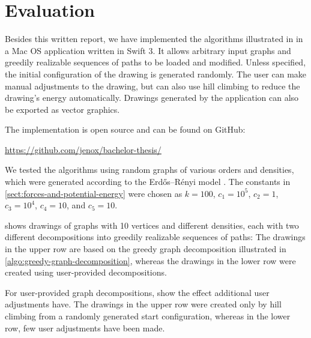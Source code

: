 \section{Evaluation}
\label{sect:evaluation}

\newcommand{\expnumber}[2]{{#1}\mathrm{e}{#2}}
\newcommand{\drawing}[1]{\setlength\fboxsep{0pt}\colorbox{gray!10}{\makebox(110,110){\texttt{[image: \#1]}}}}

Besides this written report, we have implemented the algorithms illustrated in  in a Mac OS application written in Swift 3. It allows arbitrary input graphs and greedily realizable sequences of paths to be loaded and modified. Unless specified, the initial configuration of the drawing is generated randomly. The user can make manual adjustments to the drawing, but can also use hill climbing to reduce the drawing's energy automatically. Drawings generated by the application can also be exported as vector graphics.

The implementation is open source and can be found on GitHub:
%
\begin{center}
  \url{https://github.com/jenox/bachelor-thesis/}
\end{center}






We tested the algorithms using random graphs of various orders and densities, which were generated according to the Erdős--Rényi model \cite{Erdos, Gilbert}. The constants in \cref{sect:forces-and-potential-energy} were chosen as ${k = 100}$, ${c_1 = 10^5}$, ${c_2 = 1}$, ${c_3 = 10^4}$, ${c_4 = 10}$, and ${c_5 = 10}$.

 shows drawings of graphs with 10 vertices and different densities, each with two different decompositions into greedily realizable sequences of paths: The drawings in the upper row are based on the greedy graph decomposition illustrated in \cref{algo:greedy-graph-decomposition}, whereas the drawings in the lower row were created using user-provided decompositions.

For user-provided graph decompositions,  show the effect additional user adjustments have. The drawings in the upper row were created only by hill climbing from a randomly generated start configuration, whereas in the lower row, few user adjustments have been made.

